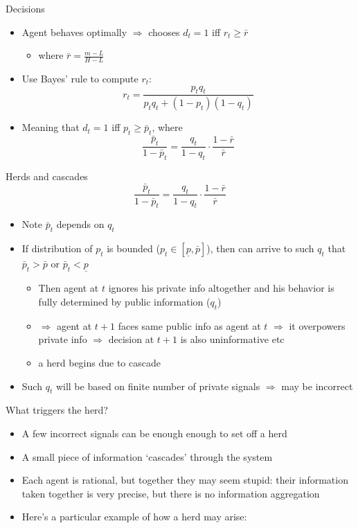 \documentclass[english,10pt
,aspectratio=169
]{beamer}
\begin{document}
\begin{frame}{Decisions}
	\begin{itemize}
		\item Agent behaves optimally $\Rightarrow$ chooses $d_t=1$ iff $r_t \geq \bar{r}$
		\begin{itemize}
			\item where $\bar{r} = \frac{m-L}{H-L}$
		\end{itemize}
		\item Use Bayes' rule to compute $r_t$: 
		\[r_t = \frac{p_t q_t}{p_t q_t + (1-p_t) (1-q_t)}\]
		\item Meaning that $d_t = 1$ iff $p_t \geq \bar{p}_t$, where
		\[ \frac{\bar{p}_t}{1-\bar{p}_t} = \frac{q_t}{1-q_t} \cdot \frac{1-\bar{r}}{\bar{r}} \]
	\end{itemize}
\end{frame}


\begin{frame}{Herds and cascades}
	\[ \frac{\bar{p}_t}{1-\bar{p}_t} = \frac{q_t}{1-q_t} \cdot \frac{1-\bar{r}}{\bar{r}} \]
	\vspace{-1em}
	\begin{itemize}
		\item Note $\bar{p}_t$ depends on $q_t$
		\item If distribution of $p_t$ is bounded ($p_t \in [\underline{p},\bar{p}]$), then can arrive to such $q_t$ that $\bar{p}_t > \bar{p}$ or $\bar{p}_t < \underline{p}$
		\begin{itemize}
			\item Then agent at $t$ ignores his private info altogether and his behavior is fully determined by public information ($q_t$)
			\item $\Rightarrow$ agent at $t+1$ faces same public info as agent at $t$ $\Rightarrow$ it overpowers private info $\Rightarrow$ decision at $t+1$ is also uninformative etc
			\item a \alert{herd} begins due to cascade
		\end{itemize}
		\item Such $q_t$ will be based on finite number of private signals $\Rightarrow$ \alert{may be incorrect}
	\end{itemize}
\end{frame}


\begin{frame}{What triggers the herd?} \label{HERD}
	\begin{itemize}
		\item A few incorrect signals can be enough enough to set off a herd
		\item A small piece of information `cascades' through the system
		\item Each agent is rational, but together they may seem stupid: their information taken together is very precise, but there is no information aggregation
		\item Here's a particular example of how a herd may arise: \hyperlink{EXP}{}
	\end{itemize}
\end{frame}
\end{document}
